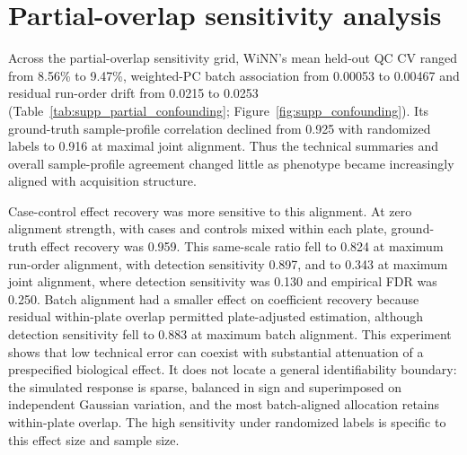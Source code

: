 \documentclass[namedate,webpdf,modern,large,nocrop]{oup-authoring-template}
\begin{document}
\begingroup

\endgroup

\clearpage
\section{Partial-overlap sensitivity analysis}
\label{sec:supp_confounding_results}

Across the partial-overlap sensitivity grid, WiNN's mean held-out QC CV ranged from 8.56\% to 9.47\%, weighted-PC batch association from 0.00053 to 0.00467 and residual run-order drift from 0.0215 to 0.0253 (Table~\ref{tab:supp_partial_confounding}; Figure~\ref{fig:supp_confounding}). Its ground-truth sample-profile correlation declined from 0.925 with randomized labels to 0.916 at maximal joint alignment. Thus the technical summaries and overall sample-profile agreement changed little as phenotype became increasingly aligned with acquisition structure.

Case-control effect recovery was more sensitive to this alignment. At zero alignment strength, with cases and controls mixed within each plate, ground-truth effect recovery was 0.959. This same-scale ratio fell to 0.824 at maximum run-order alignment, with detection sensitivity 0.897, and to 0.343 at maximum joint alignment, where detection sensitivity was 0.130 and empirical FDR was 0.250. Batch alignment had a smaller effect on coefficient recovery because residual within-plate overlap permitted plate-adjusted estimation, although detection sensitivity fell to 0.883 at maximum batch alignment. This experiment shows that low technical error can coexist with substantial attenuation of a prespecified biological effect. It does not locate a general identifiability boundary: the simulated response is sparse, balanced in sign and superimposed on independent Gaussian variation, and the most batch-aligned allocation retains within-plate overlap. The high sensitivity under randomized labels is specific to this effect size and sample size.
\end{document}
